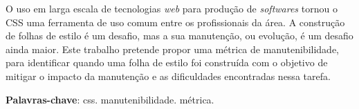 %
%

\begin{resumo}

O uso em larga escala de tecnologias \textit{web} para produção de \textit{softwares} tornou o CSS uma ferramenta de uso comum entre os profissionais da área.
A construção de folhas de estilo é um desafio, mas a sua manutenção, ou evolução, é um desafio ainda maior. Este trabalho pretende propor uma métrica de manutenibilidade, para identificar quando uma folha de estilo foi construída com o objetivo de mitigar o impacto da manutenção e as dificuldades encontradas nessa tarefa.

\textbf{Palavras-chave}: css. manutenibilidade. métrica.

\end{resumo}
